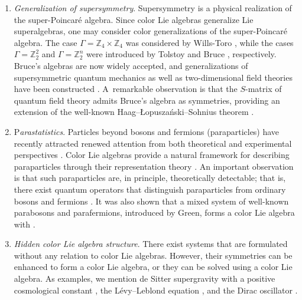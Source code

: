 \documentclass[pdftex]{sigma}
\numberwithin{equation}{section}
\theoremstyle{definition}
\def\Z2{\mathbb{Z}_2^2}
\begin{document}
\begin{enumerate}
\item[(iv)] \emph{Generalization of supersymmetry}.
Supersymmetry is a physical realization of the super-Poincar\'e algebra.
Since color Lie algebras generalize Lie superalgebras, one may consider color generalizations of the super-Poincar\'e algebra.
The case $\Gamma = \mathbb{Z}_4 \times \mathbb{Z}_4$ was considered by Wills-Toro \cite{WTIQ,WTz4}, while the cases $\Gamma = \Z2$ and $\Gamma = \mathbb{Z}_2^n$ were introduced by Tolstoy \cite{tolstoy2014} and Bruce \cite{BruceSUSY}, respectively.
Bruce’s algebras are now widely accepted, and generalizations of supersymmetric quantum mechanics \cite{Aizawa_2020,AiAmaDoiZn, BruDup} as well as two-dimensional field theories have been constructed \cite{AiItoTa, BruSigma}.
A~remarkable observation is that the $S$-matrix of quantum field theory admits Bruce's algebra as symmetries, providing an extension of the well-known Haag--{\L}opusza{\'n}ski--Sohnius theorem \cite{ItoNago}.

\item[(v)] P\emph{arastatistics}.
Particles beyond bosons and fermions (paraparticles) have recently attracted renewed attention from both theoretical \cite{wang2025particle} and experimental perspectives \cite{huerta2025particle,alderete2025experimental}.
Color Lie algebras provide a natural framework for describing paraparticles through their representation theory \cite{BALBINO,SVdJ2018,SVdJ2024,toppan2022first,toppan2024braid}.
An important observation is that such paraparticles are, in principle, theoretically detectable; that is, there exist quantum operators that distinguish paraparticles from ordinary bosons and fermions \cite{toppan2021inequivalent,toppanMulti,toppan2024detectability}.
It was also shown that a mixed system of well-known parabosons and parafermions, introduced by Green, forms a color Lie algebra with \smash{$\Gamma = \Z2$} \cite{tolstoyOnce}.

\item[(vi)] \emph{Hidden color Lie algebra structure}.
There exist systems that are formulated without any relation to color Lie algebras. However, their symmetries can be enhanced to form a color Lie algebra, or they can be solved using a color Lie algebra.
As examples, we mention de Sitter supergravity with a positive cosmological constant \cite{Vasiliev}, the L\'evy–Leblond equation \cite{LLEprogress,LLEproceed,RyanLL}, and the Dirac oscillator \cite{IsRyan}.
\end{enumerate}
\end{document}
